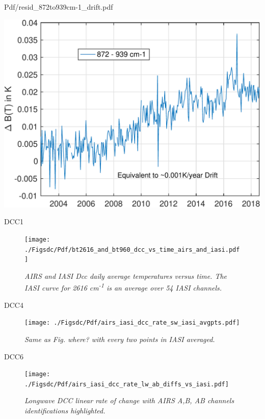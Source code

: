 \documentclass[presentation]{beamer}
\begin{document}
\begin{frame}[label={sec:org053f169}]{Pdf/resid\_872to939cm-1\_drift.pdf}
\begin{center}
\includegraphics[width=0.7\linewidth]{./Figs/Pdf/resid_872to939cm-1_drift.pdf}
\end{center}
\end{frame}


\begin{frame}[label={sec:org3f394be}]{DCC1}
\begin{figure}[htbp]
\centering
\texttt{[image: ./Figsdc/Pdf/bt2616\_and\_bt960\_dcc\_vs\_time\_airs\_and\_iasi.pdf]}
\caption{\emph{AIRS and IASI Dcc daily average temperatures versus time.  The IASI curve for 2616 cm\textsuperscript{-1} is an average over 54 IASI channels.}}
\end{figure}
\end{frame}

\begin{frame}[label={sec:orgae23e44}]{DCC4}
\begin{figure}[htbp]
\centering
\texttt{[image: ./Figsdc/Pdf/airs\_iasi\_dcc\_rate\_sw\_iasi\_avgpts.pdf]}
\caption{\emph{Same as Fig. where? with every two points in IASI averaged.}}
\end{figure}
\end{frame}

\begin{frame}[label={sec:org2ac9e8d}]{DCC6}
\begin{figure}[htbp]
\centering
\texttt{[image: ./Figsdc/Pdf/airs\_iasi\_dcc\_rate\_lw\_ab\_diffs\_vs\_iasi.pdf]}
\caption{\emph{Longwave DCC linear rate of change with AIRS A,B, AB channels identifications highlighted.}}
\end{figure}
\end{frame}
\end{document}
